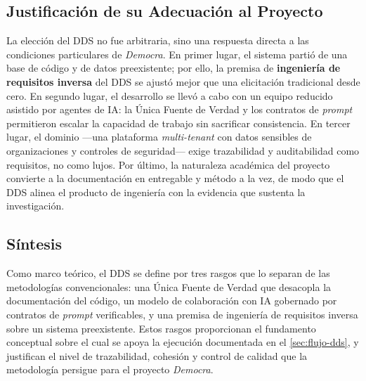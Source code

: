 \subsection{Justificación de su Adecuación al Proyecto}
\label{subsec:dds_justificacion}

La elección del DDS no fue arbitraria, sino una respuesta directa a las condiciones
particulares de \textit{Democra}. En primer lugar, el sistema partió de una base de
código y de datos preexistente; por ello, la premisa de \textbf{ingeniería de
requisitos inversa} del DDS se ajustó mejor que una elicitación tradicional desde
cero. En segundo lugar, el desarrollo se llevó a cabo con un equipo reducido asistido
por agentes de IA: la Única Fuente de Verdad y los contratos de \textit{prompt}
permitieron escalar la capacidad de trabajo sin sacrificar consistencia. En tercer
lugar, el dominio ---una plataforma \textit{multi-tenant} con datos sensibles de
organizaciones y controles de seguridad--- exige trazabilidad y auditabilidad como
requisitos, no como lujos. Por último, la naturaleza académica del proyecto convierte
a la documentación en entregable y método a la vez, de modo que el DDS alinea el
producto de ingeniería con la evidencia que sustenta la investigación.

\subsection{Síntesis}
\label{subsec:dds_sintesis}

Como marco teórico, el DDS se define por tres rasgos que lo separan de las
metodologías convencionales: una Única Fuente de Verdad que desacopla la
documentación del código, un modelo de colaboración con IA gobernado por contratos
de \textit{prompt} verificables, y una premisa de ingeniería de requisitos inversa
sobre un sistema preexistente. Estos rasgos proporcionan el fundamento conceptual
sobre el cual se apoya la ejecución documentada en el \autoref{sec:flujo-dds}, y
justifican el nivel de trazabilidad, cohesión y control de calidad que la
metodología persigue para el proyecto \textit{Democra}.

